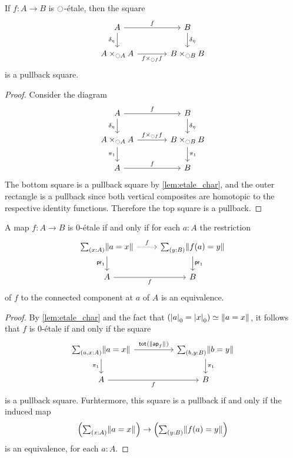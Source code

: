 \documentclass[9pt,twosided]{amsart}
\begin{document}
\begin{cor}
If $f:A\to B$ is ${\ocircle}$-\'etale, then the square
\begin{equation*}
\begin{tikzcd}[column sep=large]
A \arrow[d,swap,"\delta_{\modalunit}"] \arrow[r,"f"] & B \arrow[d,"\delta_{\modalunit}"] \\
A\times_{\modal A} A \arrow[r,swap,"f\times_{\modal f}f"] & B\times_{\modal B} B
\end{tikzcd}
\end{equation*}
is a pullback square.
\end{cor}

\begin{proof}
Consider the diagram
\begin{equation*}
\begin{tikzcd}[column sep=large]
A \arrow[d,swap,"\delta_{\modalunit}"] \arrow[r,"f"] & B \arrow[d,"\delta_{\modalunit}"] \\
A\times_{\modal A} A \arrow[d,swap,"\pi_1"] \arrow[r,"{f\times_{\modal f} f}"] & B\times_{\modal B} B \arrow[d,"\pi_1"] \\
A \arrow[r,"f"] & B
\end{tikzcd}
\end{equation*}
The bottom square is a pullback square by \cref{lem:etale_char}, and the outer rectangle is a pullback since both vertical composites are homotopic to the respective identity functions. Therefore the top square is a pullback.
\end{proof}

\begin{thm}
A map $f:A\to B$ is $0$-\'etale if and only if for each $a:A$ the restriction
\begin{equation*}
\begin{tikzcd}
\sm{x:A}\brck{a=x} \arrow[d,swap,"\proj 1"] \arrow[r,densely dotted,"f"] & \sm{y:B}\brck{f(a)=y} \arrow[d,"\proj 1"] \\
A \arrow[r,swap,"f"] & B
\end{tikzcd}
\end{equation*}
of $f$ to the connected component at $a$ of $A$ is an equivalence. 
\end{thm}

\begin{proof}
By \cref{lem:etale_char} and the fact that $\eqv{(\tproj{0}{a}=\tproj{0}{x})}{\brck{a=x}}$, it follows that $f$ is $0$-\'etale if and only if the square
\begin{equation*}
\begin{tikzcd}[column sep=huge]
\sm{a,x:A}\brck{a=x} \arrow[d,swap,"\pi_1"] \arrow[r,"\total{\brck{\apfunc{f}}}"] & \sm{b,y:B}\brck{b=y} \arrow[d,"\pi_1"] \\
A \arrow[r,swap,"f"] & B
\end{tikzcd}
\end{equation*}
is a pullback square. Furhtermore, this square is a pullback if and only if the induced map
\begin{equation*}
\Big(\sm{x:A}\brck{a=x}\Big)\to\Big(\sm{y:B}\brck{f(a)=y}\Big)
\end{equation*}
is an equivalence, for each $a:A$.
\end{proof}
\end{document}
